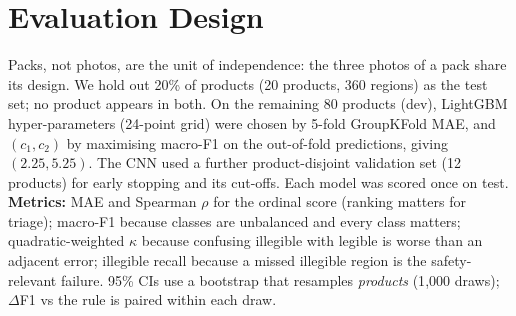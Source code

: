 \documentclass{article}
\begin{document}
\section{Evaluation Design}
Packs, not photos, are the unit of independence: the three photos of a pack share its design. We hold out 20\% of products
(20 products, 360 regions) as the test set; no product appears in both. On the remaining 80 products (dev), LightGBM
hyper-parameters (24-point grid) were chosen by 5-fold GroupKFold MAE, and $(c_1,c_2)$ by maximising macro-F1 on the
out-of-fold predictions, giving $(2.25, 5.25)$. The CNN used a further product-disjoint validation set (12 products) for
early stopping and its cut-offs. Each model was scored once on test. \textbf{Metrics:} MAE and Spearman $\rho$ for the
ordinal score (ranking matters for triage); macro-F1 because classes are unbalanced and every class matters;
quadratic-weighted $\kappa$ because confusing illegible with legible is worse than an adjacent error; illegible recall
because a missed illegible region is the safety-relevant failure. 95\% CIs use a bootstrap that resamples \emph{products}
(1{,}000 draws); $\Delta$F1 vs the rule is paired within each draw.
\end{document}
